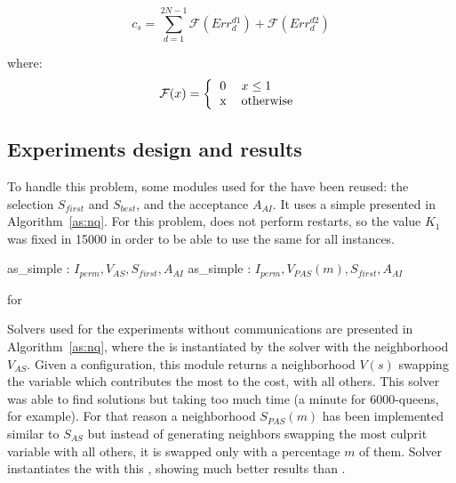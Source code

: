 \begin{equation}\label{func:cost_nqp}
c_s=\sum_{d=1}^{2N-1}{\mathcal{F}(Err^{d1}_{d}) + \mathcal{F}(Err^{d2}_{d})}
\end{equation}

where:
\begin{equation*}
\mathcal{F}(x)=\left\{
\begin{tabular}{ll}
0 & $x \leq 1$ \\
x & otherwise
\end{tabular}
\right.
\end{equation*}

\subsection{Experiments design and results}

To handle this problem, some modules used for the \sgp{} have been reused: the selection \oms{} $S_{first}$ and $S_{best}$, and the acceptance \om{} $A_{AI}$. It uses a simple \as{} presented in Algorithm~\ref{as:nq}. For this problem, \posl{} does not perform restarts, so the value $K_1$ was fixed in 15000 in order to be able to use the same \as{} for all instances. 

\begin{algorithm}[H]
\dontprintsemicolon
\SetNoline
{}
   as\_simple\;
\algoindent {} : $I_{perm}, V_{AS}, S_{first}, A_{AI}$ \;
   as\_simple\;
\algoindent {} : $I_{perm}, V_{PAS}(m), S_{first}, A_{AI}$ \; 
\caption{\As{} for \NQP}\label{as:nq}
\end{algorithm}

Solvers used for the experiments without communications are presented in Algorithm~\ref{as:nq}, where the \as{} is instantiated by the solver  with the neighborhood \om{} $V_{AS}$. Given a configuration, this module returns a neighborhood $V\left(s\right)$ swapping the variable which contributes the most to the cost, with all others. This solver was able to find solutions but taking too much time (a minute for 6000-queens, for example). For that reason a neighborhood \om{} $S_{PAS}(m)$ has been implemented similar to $S_{AS}$ but instead of generating neighbors swapping the most culprit variable with all others, it is swapped only with a percentage $m$ of them. Solver  instantiates the \as{} with this \om, showing much better results than .

